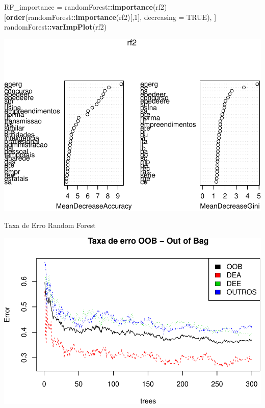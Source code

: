 \documentclass[]{article}
\newenvironment{Shaded}{\begin{snugshade}}{\end{snugshade}}
\newcommand{\KeywordTok}[1]{\textcolor[rgb]{0.13,0.29,0.53}{\textbf{#1}}}
\newcommand{\DataTypeTok}[1]{\textcolor[rgb]{0.13,0.29,0.53}{#1}}
\newcommand{\DecValTok}[1]{\textcolor[rgb]{0.00,0.00,0.81}{#1}}
\newcommand{\StringTok}[1]{\textcolor[rgb]{0.31,0.60,0.02}{#1}}
\newcommand{\OtherTok}[1]{\textcolor[rgb]{0.56,0.35,0.01}{#1}}
\newcommand{\OperatorTok}[1]{\textcolor[rgb]{0.81,0.36,0.00}{\textbf{#1}}}
\newcommand{\NormalTok}[1]{#1}
\begin{document}
\begin{Shaded}
\begin{Highlighting}[]
\NormalTok{RF_importance =}\StringTok{ }\NormalTok{randomForest}\OperatorTok{::}\KeywordTok{importance}\NormalTok{(rf2)[}\KeywordTok{order}\NormalTok{(randomForest}\OperatorTok{::}\KeywordTok{importance}\NormalTok{(rf2)[,}\DecValTok{1}\NormalTok{], }\DataTypeTok{decreasing =} \OtherTok{TRUE}\NormalTok{), ]}
\NormalTok{randomForest}\OperatorTok{::}\KeywordTok{varImpPlot}\NormalTok{(rf2)}
\end{Highlighting}
\end{Shaded}

\includegraphics{markdown_v41_test_files/figure-latex/unnamed-chunk-88-1.pdf}

Taxa de Erro Random Forest

\begin{Shaded}
\end{Shaded}

\includegraphics{markdown_v41_test_files/figure-latex/unnamed-chunk-89-1.pdf}
\end{document}
